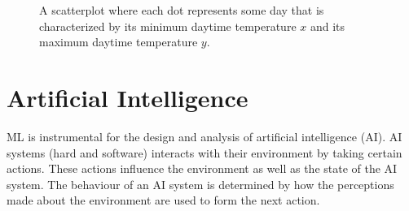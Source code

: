 \documentclass[12pt]{report}
\newcommand{\boundellipse}[3]%
{(#1) ellipse (#2 and #3)
}
\begin{document}
\begin{figure}[htbp]
	\begin{center}
		\vspace*{-14mm}
	\end{center}
	\caption{A scatterplot where each dot represents some day that is characterized 
		by its minimum daytime temperature $x$ and its maximum daytime temperature $y$.}
	\label{fig_scatterplot_temp_FMI_stat_model}
	\vspace*{-3mm}
\end{figure}




\section{Artificial Intelligence}

ML is instrumental for the design and analysis of artificial intelligence (AI). 
AI systems (hard and software) interacts with their environment by 
taking certain actions. These actions influence the environment as 
well as the state of the AI system. The behaviour of an AI system 
is determined by how the perceptions made about the environment 
are used to form the next action. 
\end{document}
